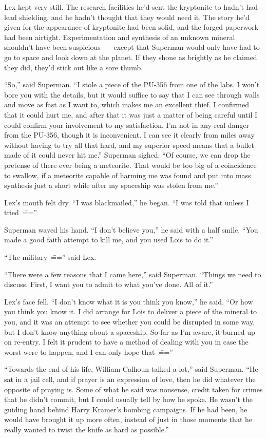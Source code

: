 Lex kept very still. The research facilities he'd sent the kryptonite to
hadn't had lead shielding, and he hadn't thought that they would need
it. The story he'd given for the appearance of kryptonite had been
solid, and the forged paperwork had been airtight. Experimentation and
synthesis of an unknown mineral shouldn't have been suspicious~---
except that Superman would only have had to go to space and look down at
the planet. If they shone as brightly as he claimed they did, they'd
stick out like a sore thumb.

``So,'' said Superman. ``I stole a piece of the PU‐356 from one of the
labs. I won't bore you with the details, but it would suffice to say
that I can see through walls and move as fast as I want to, which makes
me an excellent thief. I confirmed that it could hurt me, and after that
it was just a matter of being careful until I could confirm your
involvement to my satisfaction. I'm not in any real danger from the
PU‐356, though it is inconvenient. I can see it clearly from miles away
without having to try all that hard, and my superior speed means that a
bullet made of it could never hit me.'' Superman sighed. ``Of course, we
can drop the pretense of there ever being a meteorite. That would be too
big of a coincidence to swallow, if a meteorite capable of harming me
was found and put into mass synthesis just a short while after my
spaceship was stolen from me.''

Lex's mouth felt dry. ``I was blackmailed,'' he began. ``I was told that
unless I tried~\===''

Superman waved his hand. ``I don't believe you,'' he said with a half
smile. ``You made a good faith attempt to kill me, and you used Lois to
do it.''

``The military~\==='' said Lex.

``There were a few reasons that I came here,'' said Superman. ``Things
we need to discuss. First, I want you to admit to what you've done. All
of it.''

Lex's face fell. ``I don't know what it is you think you know,'' he
said. ``Or how you think you know it. I did arrange for Lois to deliver
a piece of the mineral to you, and it was an attempt to see whether you
could be disrupted in some way, but I don't know anything about a
spaceship. So far as I'm aware, it burned up on re‐entry. I felt it
prudent to have a method of dealing with you in case the worst were to
happen, and I can only hope that~\===''

``Towards the end of his life, William Calhoun talked a lot,'' said
Superman. ``He sat in a jail cell, and if prayer is an expression of
love, then he did whatever the opposite of praying is. Some of what he
said was nonsense, credit taken for crimes that he didn't commit, but I
could usually tell by how he spoke. He wasn't the guiding hand behind
Harry Kramer's bombing campaigns. If he had been, he would have brought
it up more often, instead of just in those moments that he really wanted
to twist the knife as hard as possible.''

